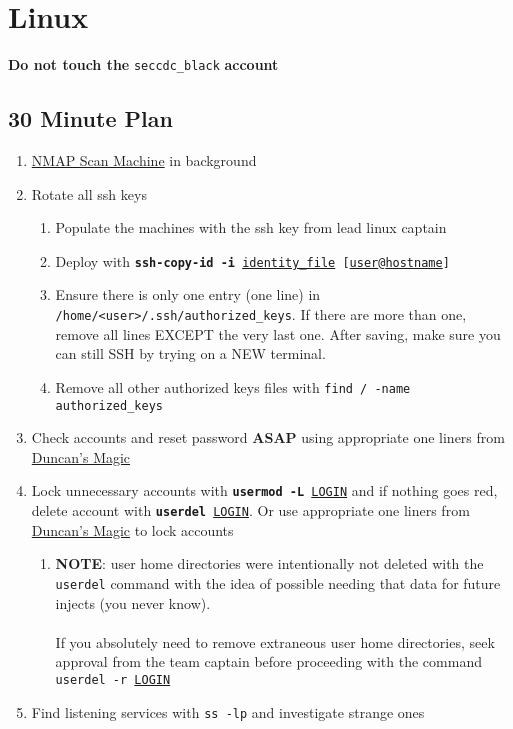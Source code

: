 \documentclass[12pt,letterpaper]{article}
\def\code#1{\textcolor{iris}{\texttt{#1}}}
\def\bf#1{\textbf{#1}}
\def\ul#1{\underline{#1}}
\begin{document}
\pagebreak

\section{Linux}

\bf{Do not touch the} \code{seccdc\_black} \bf{account}

\subsection{30 Minute Plan}

\begin{enumerate}
	\item \hyperref[nmap]{NMAP Scan Machine} in background
	\item Rotate all ssh keys
		\begin{enumerate}
			\item Populate the machines with the ssh key from lead linux captain
			\item Deploy with \code{\bf{ssh-copy-id -i} \ul{identity\_file} [\ul{user}@\ul{hostname}]}
			\item Ensure there is only one entry (one line) in \code{/home/<user>/.ssh/authorized\_keys}. If there are more than one, remove all lines EXCEPT the very last one. After saving, make sure you can still SSH by trying on a NEW terminal.
			\item Remove all other authorized keys files with \code{find / -name authorized\_keys}
		\end{enumerate}
	\item Check accounts and reset password \bf{ASAP} using appropriate one liners from \hyperref[subsec:dmagic]{Duncan's Magic}
	\item Lock unnecessary accounts with \code{\bf{usermod -L} \ul{LOGIN}} and if nothing goes red, delete account with \code{\bf{userdel} \ul{LOGIN}}. Or use appropriate one liners from \hyperref[subsec:dmagic]{Duncan's Magic} to lock accounts
		\begin{enumerate}
			\item \bf{NOTE}: user home directories were intentionally not deleted with the \code{userdel} command with the idea of possible needing that data for future injects (you never know). \\ \\
				If you absolutely need to remove extraneous user home directories, seek approval from the team captain before proceeding with the command \code{userdel -r \ul{LOGIN}}
		\end{enumerate}
	\item Find listening services with \code{ss -lp} and investigate strange ones
\end{enumerate}
\end{document}
